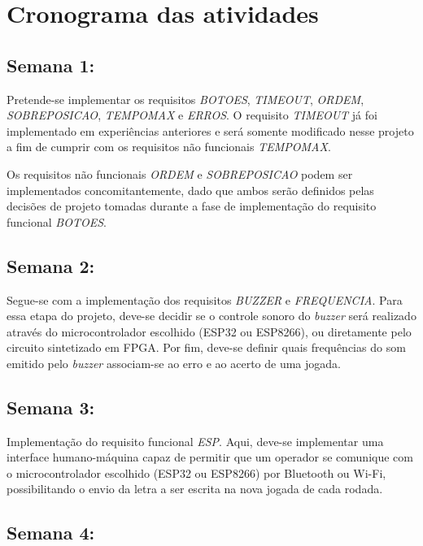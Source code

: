 \documentclass[amsmath,amssymb,floatfix]{report}
\begin{document}
\section{Cronograma das atividades}

\subsection{Semana 1:}

Pretende-se implementar os requisitos \textit{BOTOES}, \textit{TIMEOUT}, \textit{ORDEM}, \textit{SOBREPOSICAO}, \textit{TEMPOMAX} e \textit{ERROS}. O requisito \textit{TIMEOUT} já foi implementado em experiências anteriores e será somente modificado nesse projeto a fim de cumprir com os requisitos não funcionais \textit{TEMPOMAX}.

Os requisitos não funcionais \textit{ORDEM} e \textit{SOBREPOSICAO} podem ser implementados concomitantemente, dado que ambos serão definidos pelas decisões de projeto tomadas durante a fase de implementação do requisito funcional \textit{BOTOES}. 

\subsection{Semana 2:}

Segue-se com a implementação dos requisitos \textit{BUZZER} e \textit{FREQUENCIA}. Para essa etapa do projeto, deve-se decidir se o controle sonoro do \textit{buzzer} será realizado através do microcontrolador escolhido (ESP32 ou ESP8266), ou diretamente pelo circuito sintetizado em FPGA. Por fim, deve-se definir quais frequências do som emitido pelo \textit{buzzer} associam-se ao erro e ao acerto de uma jogada.

\subsection{Semana 3:}

Implementação do requisito funcional \textit{ESP}. Aqui, deve-se implementar uma interface humano-máquina capaz de permitir que um operador se comunique com o microcontrolador escolhido (ESP32 ou ESP8266) por Bluetooth ou Wi-Fi, possibilitando o envio da letra a ser escrita na nova jogada de cada rodada. 

\subsection{Semana 4:}
\label{subsec:semana4}
\end{document}
